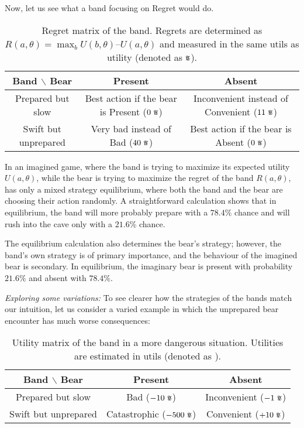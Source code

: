 \documentclass{article}
\newcommand{\util}{\scalebox{0.75}{\text{\Pfund}}}
\begin{document}
Now, let us see what a band focusing on Regret would do.

\begin{table}[h!]
    \centering
    \begin{tabular}{c|cc}
        Band $\backslash$ Bear & Present & Absent \\
        \hline
        Prepared but slow & Best action if the bear is Present ($0\ \util$) & Inconvenient instead of Convenient ($11\ \util$) \\
        Swift but unprepared & Very bad instead of Bad ($40\ \util$) & Best action if the bear is Absent ($0\ \util$) \\
    \end{tabular}
    \caption{Regret matrix of the band. Regrets are determined as $R(a,\theta) = \max_{b} U(b,\theta) – U(a,\theta)$ and measured in the same utils as utility (denoted as $\util$).}
    \label{tab:BandBearRegretMatrix}
\end{table}

In an imagined game, where the band is trying to maximize its expected utility $U(a,\theta)$, while the bear is trying to maximize the regret of the band $R(a,\theta)$, has only a mixed strategy equilibrium, where both the band and the bear are choosing their action randomly.
A straightforward calculation shows that in equilibrium, the band will more probably prepare with a $78.4\%$ chance and will rush into the cave only with a $21.6\%$ chance.

The equilibrium calculation also determines the bear's strategy; however, the band's own strategy is of primary importance, and the behaviour of the imagined bear is secondary.
In equilibrium, the imaginary bear is present with probability $21.6\%$ and absent with $78.4\%$.

{\it Exploring some variations:}
To see clearer how the strategies of the bands match our intuition, let us consider a varied example in which the unprepared bear encounter has much worse consequences:


\begin{table}[h!]
    \centering
    \begin{tabular}{c|cc}
        Band $\backslash$ Bear & Present & Absent \\
        \hline
        Prepared but slow & Bad ($-10\ \util$) & Inconvenient ($-1\ \util$) \\
        Swift but unprepared & Catastrophic ($-500\ \util$) & Convenient ($+10\ \util$) \\
    \end{tabular}
    \caption{Utility matrix of the band in a more dangerous situation. Utilities are estimated in utils (denoted as \util).}
    \label{tab:BandBearUtilityMatrix2}
\end{table}
\end{document}
